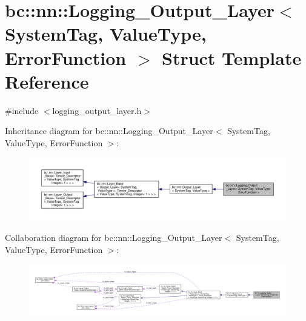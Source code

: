 \hypertarget{structbc_1_1nn_1_1Logging__Output__Layer}{}\section{bc\+:\+:nn\+:\+:Logging\+\_\+\+Output\+\_\+\+Layer$<$ System\+Tag, Value\+Type, Error\+Function $>$ Struct Template Reference}
\label{structbc_1_1nn_1_1Logging__Output__Layer}


{\ttfamily \#include $<$logging\+\_\+output\+\_\+layer.\+h$>$}



Inheritance diagram for bc\+:\+:nn\+:\+:Logging\+\_\+\+Output\+\_\+\+Layer$<$ System\+Tag, Value\+Type, Error\+Function $>$\+:\nopagebreak
\begin{figure}[H]
\begin{center}
\leavevmode
\includegraphics[width=350pt]{structbc_1_1nn_1_1Logging__Output__Layer__inherit__graph}
\end{center}
\end{figure}


Collaboration diagram for bc\+:\+:nn\+:\+:Logging\+\_\+\+Output\+\_\+\+Layer$<$ System\+Tag, Value\+Type, Error\+Function $>$\+:\nopagebreak
\begin{figure}[H]
\begin{center}
\leavevmode
\includegraphics[width=350pt]{structbc_1_1nn_1_1Logging__Output__Layer__coll__graph}
\end{center}
\end{figure}
